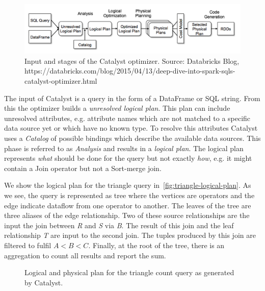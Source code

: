 \begin{figure}
    \includegraphics[width=\textwidth]{figures/catalyst-stages.png}
    \caption{
    Input and stages of the Catalyst optimizer.
    Source: Databricks Blog, https://databricks.com/blog/2015/04/13/deep-dive-into-spark-sqls-catalyst-optimizer.html
    }
    \label{fig:catalyst-stages}
\end{figure}

The input of Catalyst is a query in the form of a DataFrame or SQL string.
From this the optimizer builds a \textit{unresolved logical plan}.
This plan can include unresolved attributes, e.g. attribute names which are not matched to a specific
data source yet or which have no known type.
To resolve this attributes Catalyst uses a \textit{Catalog} of possible bindings which describe the
available data sources.
This phase is referred to as \textit{Analysis} and results in a \textit{logical plan}.
The logical plan represents \textit{what} should be done for the query but not exactly \textit{how},
e.g. it might contain a Join operator but not a Sort-merge join.

We show the logical plan for the triangle query in~\cref{fig:triangle-logical-plan}.
As we see, the query is represented as tree where the vertices are operators and the edge indicate dataflow from
one operator to another.
The leaves of the tree are three aliases of the edge relationship.
Two of these source relationships are the input the join between \textit{R} and \textit{S} via \textit{B}.
The result of this join and the leaf relationship \textit{T} are input to the second join.
The tuples produced by this join are filtered to fulfil $A < B < C$.
Finally, at the root of the tree, there is an aggregation to count all results and report the sum.

\begin{figure}
    \centering
    \caption{Logical and physical plan for the triangle count query as generated by Catalyst.}
\end{figure}

